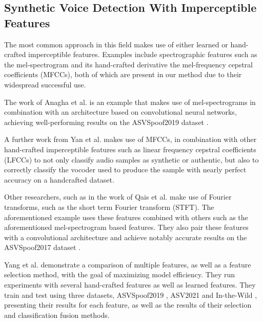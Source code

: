 \documentclass{article}
\begin{document}
	\subsection{Synthetic Voice Detection With Imperceptible Features}
	The most common approach in this field makes use of either learned or hand-crafted
	imperceptible features. Examples include spectrographic features such as the mel-spectrogram
	and its hand-crafted derivative the mel-frequency cepstral coefficients (MFCCs), both of which
	are present in our method due to their widespread successful use.
	\par
	The work of Anagha et al. \cite{anagha_audio_2023} is an example that makes use of
	mel-spectrograms in combination with an architecture based on convolutional neural networks,
	achieving well-performing results on the ASVSpoof2019 dataset \cite{wang_asvspoof_2020}.
	\par
	\sloppy
	A further work from Yan et al. \cite{yan_initial_2022} makes use of MFCCs, in combination with
	other hand-crafted imperceptible features such as linear frequency cepstral coefficients
	(LFCCs) to not only classify audio samples as synthetic or authentic, but also to correctly
	classify the vocoder used to produce the sample with nearly perfect accuracy on a handcrafted
	dataset.
	\par
	Other researchers, such as in the work of Qais et al. \cite{qais_deepfake_2022} make use of
	Fourier transforms, such as the short term Fourier transform (STFT). The aforementioned
	example uses these features combined with others such as the aforementioned mel-spectrogram
	based features. They also pair these features with a convolutional architecture and achieve
	notably accurate results on the ASVSpoof2017 dataset \cite{delgado_asvspoof_2018}.
	\par
	Yang et al. \cite{yang_robust_2024} demonstrate a comparison of multiple features, as well as a
	feature selection method, with the goal of maximizing model efficiency. They run experiments
	with several hand-crafted features as well as learned features. They train and test using
	three datasets, ASVSpoof2019 \cite{wang_asvspoof_2020}, ASV2021 \cite{liu_asvspoof_2023} and
	In-the-Wild \cite{muller_does_2022}, presenting their results for each feature, as well as
	the results of their selection and classification fusion methods.
\end{document}
